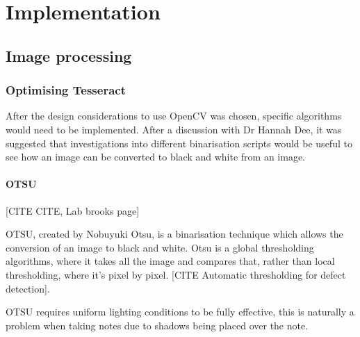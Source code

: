 \chapter{Implementation}




\section{Image processing}
\subsection{Optimising Tesseract}
After the design considerations to use OpenCV was chosen, specific algorithms would need to be implemented. After a discussion with Dr Hannah Dee, it was suggested that investigations into different binarisation scripts would be useful to see how an image can be converted to black and white from an image.

\subsubsection{OTSU}
[CITE CITE, Lab brooks page]

OTSU, created by Nobuyuki Otsu, is a binarisation technique which allows the conversion of an image to black and white. Otsu is a global thresholding algorithms, where it takes all the image and compares that, rather than local thresholding, where it's pixel by pixel. [CITE Automatic thresholding for defect detection].

OTSU requires uniform lighting conditions to be fully effective, this is naturally a problem when taking notes due to shadows being placed over the note.

